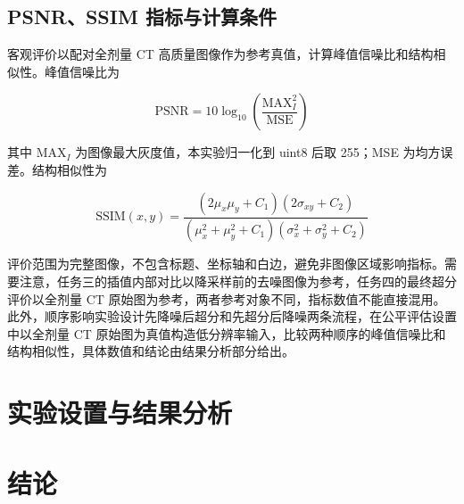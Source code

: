 \documentclass[10.5pt,compsoc,UTF8]{CjC}
\theoremstyle{mystyle}
\begin{document}
\subsection{PSNR、SSIM 指标与计算条件}

客观评价以配对全剂量 CT 高质量图像作为参考真值，计算峰值信噪比和结构相似性。峰值信噪比为

\begin{equation}
\mathrm{PSNR}=10\log_{10}\left(\frac{\mathrm{MAX}_I^2}{\mathrm{MSE}}\right)
\end{equation}

其中 \(\mathrm{MAX}_I\) 为图像最大灰度值，本实验归一化到 uint8 后取 255；MSE 为均方误差。结构相似性为

\begin{equation}
\mathrm{SSIM}(x,y)=\frac{(2\mu_x\mu_y+C_1)(2\sigma_{xy}+C_2)}
{(\mu_x^2+\mu_y^2+C_1)(\sigma_x^2+\sigma_y^2+C_2)}
\end{equation}

评价范围为完整图像，不包含标题、坐标轴和白边，避免非图像区域影响指标。需要注意，任务三的插值内部对比以降采样前的去噪图像为参考，任务四的最终超分评价以全剂量 CT 原始图为参考，两者参考对象不同，指标数值不能直接混用。此外，顺序影响实验设计先降噪后超分和先超分后降噪两条流程，在公平评估设置中以全剂量 CT 原始图为真值构造低分辨率输入，比较两种顺序的峰值信噪比和结构相似性，具体数值和结论由结果分析部分给出。
\section{\heiti 实验设置与结果分析}
\section{\heiti 结论}
\end{document}
